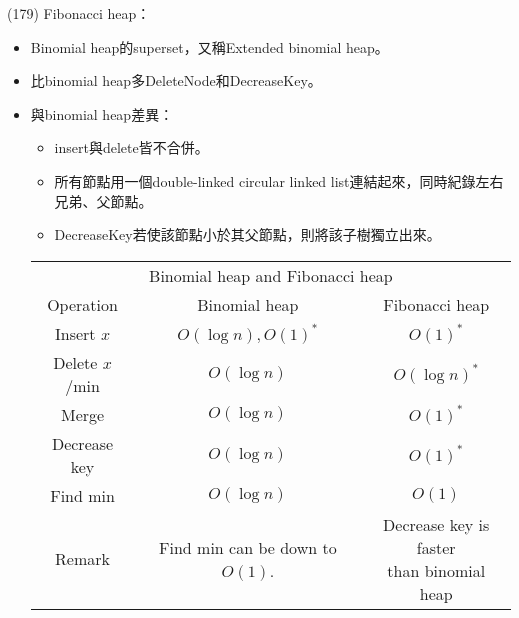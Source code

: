 \item \begin{theorem}{(179)} Fibonacci heap： \label{fibheap}\begin{itemize}
        \item Binomial heap的superset，又稱Extended binomial heap。
        \item 比binomial heap多DeleteNode和DecreaseKey。
        \item 與binomial heap差異：\begin{itemize}
            \item insert與delete皆不合併。
            \item 所有節點用一個double-linked circular linked list連結起來，同時紀錄左右兄弟、父節點。
            \item DecreaseKey若使該節點小於其父節點，則將該子樹獨立出來。
        \end{itemize}
        \begin{table}[H]
            \centering
            \begin{tabular}{|c|c|c|}
                \hline
                \multicolumn{3}{|c|}{Binomial heap and Fibonacci heap} \\
                \Xhline{3\arrayrulewidth}
                Operation & Binomial heap & Fibonacci heap \\
                \Xhline{2\arrayrulewidth}
                Insert $x$ & $O(\log n), O(1)^*$ & $O(1)^*$ \\
                \hline
                Delete $x$/min & $O(\log n)$ & $O(\log n)^*$ \\
                \hline
                Merge & $O(\log n)$ & $O(1)^*$ \\
                \hline
                Decrease key & $O(\log n)$ & $O(1)^*$ \\
                \hline
                Find min & $O(\log n)$ & $O(1)$ \\
                \hline
                Remark & \makecell{Find min can be\\down to $O(1)$.} & \makecell{Decrease key is faster\\than binomial heap} \\
                \hline
            \end{tabular}
        \end{table}
    \end{itemize}
\end{theorem}
